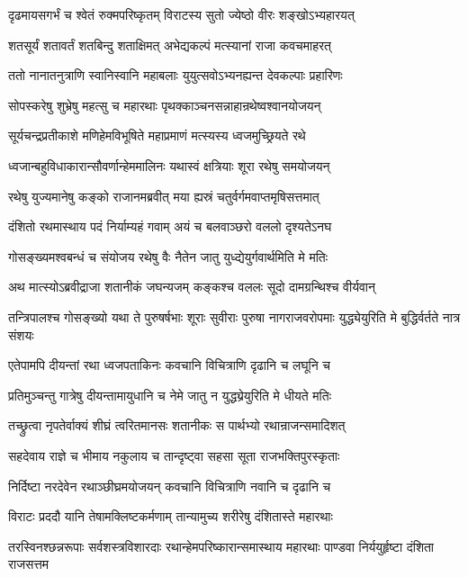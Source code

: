 \twolineshloka
{दृढमायसगर्भं च श्वेतं रुक्मपरिष्कृतम्}
{विराटस्य सुतो ज्येष्ठो वीरः शङ्खोऽभ्यहारयत्}


\twolineshloka
{शतसूर्यं शतावर्तं शतबिन्दु शताक्षिमत्}
{अभेद्यकल्पं मत्स्यानां राजा कवचमाहरत्}


\twolineshloka
{ततो नानातनुत्राणि स्वानिस्वानि महाबलाः}
{युयुत्सवोऽभ्यनह्यन्त देवकल्पाः प्रहारिणः}


\twolineshloka
{सोपस्करेषु शुभ्रेषु महत्सु च महारथाः}
{पृथक्काञ्चनसन्नाहान्रथेष्वश्वानयोजयन्}


\twolineshloka
{सूर्यचन्द्रप्रतीकाशे मणिहेमविभूषिते}
{महाप्रमाणं मत्स्यस्य ध्वजमुच्छ्रियते रथे}


\twolineshloka
{ध्वजान्बहुविधाकारान्सौवर्णान्हेममालिनः}
{यथास्वं क्षत्रियाः शूरा रथेषु समयोजयन्}


\twolineshloka
{रथेषु युज्यमानेषु कङ्को राजानमब्रवीत्}
{मया ह्यस्रं चतुर्वर्गमवाप्तमृषिसत्तमात्}


\twolineshloka
{दंशितो रथमास्थाय पदं निर्याम्यहं गवाम्}
{अयं च बलवाञ्छरो वललो दृश्यतेऽनघ}


\twolineshloka
{गोसङ्ख्यमश्वबन्धं च संयोजय रथेषु वैः}
{नैतेन जातु युध्द्येयुर्गवार्थमिति मे मतिः}



\twolineshloka
{अथ मात्स्योऽब्रवीद्राजा शतानीकं जघन्यजम्}
{कङ्कश्च वललः सूदो दामग्रन्थिश्च वीर्यवान्}


\threelineshloka
{तन्त्रिपालश्च गोसङ्ख्यो यथा ते पुरुषर्षभाः}
{शूराः सुवीराः पुरुषा नागराजवरोपमाः}
{युद्ध्येयुरिति मे बुद्धिर्वर्तते नात्र संशयः}


\twolineshloka
{एतेपामपि दीयन्तां रथा ध्वजपताकिनः}
{कवचानि विचित्राणि दृढानि च लघूनि च}


\twolineshloka
{प्रतिमुञ्चन्तु गात्रेषु दीयन्तामायुधानि च}
{नेमे जातु न युद्ध्य्रेयुरिति मे धीयते मतिः}



\twolineshloka
{तच्छ्रुत्वा नृपतेर्वाक्यं शीघ्रं त्वरितमानसः}
{शतानीकः स पार्थभ्यो रथान्राजन्समादिशत्}


\twolineshloka
{सहदेवाय राज्ञे च भीमाय नकुलाय च}
{तान्दृष्ट्वा सहसा सूता राजभक्तिपुरस्कृताः}


\twolineshloka
{निर्दिष्टा नरदेवेन रथाञ्छीघ्रमयोजयन्}
{कवचानि विचित्राणि नवानि च दृढानि च}


\twolineshloka
{विराटः प्रददौ यानि तेषामक्लिष्टकर्मणाम्}
{तान्यामुच्य शरीरेषु दंशितास्ते महारथाः}


\threelineshloka
{तरस्विनश्छन्नरूपाः सर्वशस्त्रविशारदाः}
{रथान्हेमपरिष्कारान्समास्थाय महारथाः}
{पाण्डवा निर्ययुर्हृष्टा दंशिता राजसत्तम}



